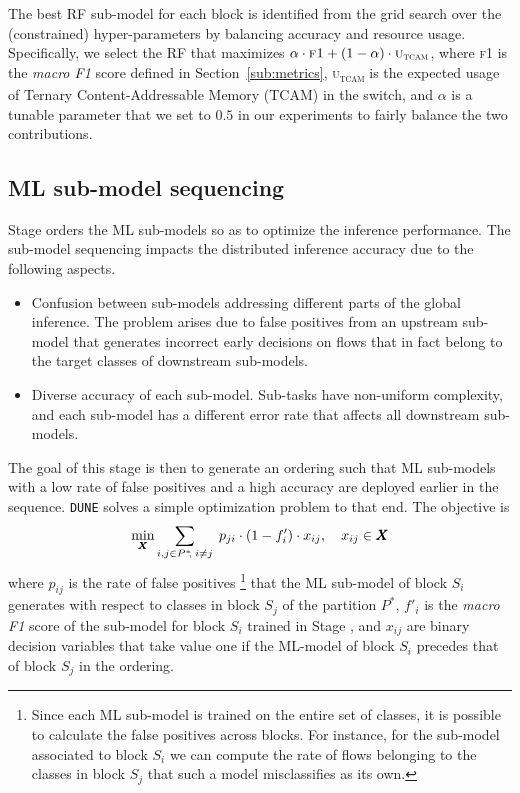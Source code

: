 \documentclass[journal]{IEEEtran}
\theoremstyle{plain} %
\newcommand*\numO[1]{\raisebox{.5pt}{\textcircled{\raisebox{-.9pt} {#1}}}}
\newcommand{\name}{\texttt{\fontsize{9}{11}\selectfont DUNE}\xspace}
\begin{document}
The best RF sub-model for each block is identified from the grid search over the (constrained) hyper-parameters by balancing accuracy and resource usage. Specifically, we select the RF that maximizes
$\alpha\cdot \text{\sc{f1}} +(1-\alpha)\cdot \text{\sc{u\textsubscript{tcam}}}$, where \textsc{f1} is the \textit{macro F1} score defined in Section~\ref{sub:metrics}, \textsc{u\textsubscript{tcam}} is the expected usage of Ternary Content-Addressable Memory (TCAM) in the switch, and $\alpha$ is a tunable parameter that we set to $0.5$ in our experiments to fairly balance the two contributions.

\subsection{ML sub-model sequencing}
\label{sub:sequencing}

Stage \numO{5} orders the ML sub-models so as to optimize the inference performance. The sub-model sequencing impacts the distributed inference accuracy due to the following aspects.
\begin{itemize}
    \item Confusion between sub-models addressing different parts of the global inference. The problem arises due to false positives from an upstream sub-model that generates incorrect early decisions on flows that in fact belong to the target classes of downstream sub-models.
    \item Diverse accuracy of each sub-model. Sub-tasks have non-uniform complexity, and each sub-model has a different error rate that affects all downstream sub-models.
\end{itemize}
The goal of this stage is then to generate an ordering such that ML sub-models with a low rate of false positives and a high accuracy are deployed earlier in the sequence. \name solves a simple optimization problem to that end. The objective is
\begin{equation}
\min_{\pmb{X}} \sum_{i,j\in P^*\hspace*{-2pt},\;i\neq j} \; p_{ji} \cdot (1 - f'_{i}) \cdot x_{ij}, \quad x_{ij}\in\pmb{X}
\label{eq:seq-objective}
\end{equation}
where $p_{ij}$ is the rate of false positives%
\footnote{Since each ML sub-model is trained on the entire set of classes, it is possible to calculate the false positives across blocks. For instance, for the sub-model associated to block $S_i$ we can compute the rate of flows belonging to the classes in block $S_j$ that such a model misclassifies as its own.}
that the ML sub-model of block $S_i$ generates with respect to classes in block $S_j$ of the partition $P^*$, $f'_i$ is the \textit{macro F1} score of the sub-model for block $S_i$ trained in Stage \numO{3}, and $x_{ij}$ are binary decision variables that take value one if the ML-model of block $S_i$ precedes that of block $S_j$ in the ordering.
\end{document}
